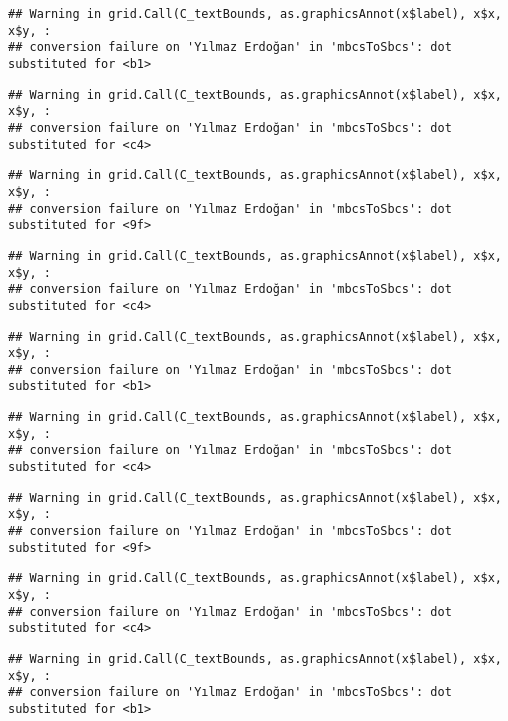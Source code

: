 \documentclass[
]{article}
\begin{document}
\begin{verbatim}
## Warning in grid.Call(C_textBounds, as.graphicsAnnot(x$label), x$x, x$y, :
## conversion failure on 'Yılmaz Erdoğan' in 'mbcsToSbcs': dot substituted for <b1>
\end{verbatim}

\begin{verbatim}
## Warning in grid.Call(C_textBounds, as.graphicsAnnot(x$label), x$x, x$y, :
## conversion failure on 'Yılmaz Erdoğan' in 'mbcsToSbcs': dot substituted for <c4>
\end{verbatim}

\begin{verbatim}
## Warning in grid.Call(C_textBounds, as.graphicsAnnot(x$label), x$x, x$y, :
## conversion failure on 'Yılmaz Erdoğan' in 'mbcsToSbcs': dot substituted for <9f>
\end{verbatim}

\begin{verbatim}
## Warning in grid.Call(C_textBounds, as.graphicsAnnot(x$label), x$x, x$y, :
## conversion failure on 'Yılmaz Erdoğan' in 'mbcsToSbcs': dot substituted for <c4>
\end{verbatim}

\begin{verbatim}
## Warning in grid.Call(C_textBounds, as.graphicsAnnot(x$label), x$x, x$y, :
## conversion failure on 'Yılmaz Erdoğan' in 'mbcsToSbcs': dot substituted for <b1>
\end{verbatim}

\begin{verbatim}
## Warning in grid.Call(C_textBounds, as.graphicsAnnot(x$label), x$x, x$y, :
## conversion failure on 'Yılmaz Erdoğan' in 'mbcsToSbcs': dot substituted for <c4>
\end{verbatim}

\begin{verbatim}
## Warning in grid.Call(C_textBounds, as.graphicsAnnot(x$label), x$x, x$y, :
## conversion failure on 'Yılmaz Erdoğan' in 'mbcsToSbcs': dot substituted for <9f>
\end{verbatim}

\begin{verbatim}
## Warning in grid.Call(C_textBounds, as.graphicsAnnot(x$label), x$x, x$y, :
## conversion failure on 'Yılmaz Erdoğan' in 'mbcsToSbcs': dot substituted for <c4>
\end{verbatim}

\begin{verbatim}
## Warning in grid.Call(C_textBounds, as.graphicsAnnot(x$label), x$x, x$y, :
## conversion failure on 'Yılmaz Erdoğan' in 'mbcsToSbcs': dot substituted for <b1>
\end{verbatim}
\end{document}

